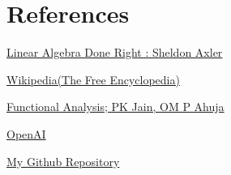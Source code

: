 \documentclass[12pt, a4paper]{article} %
\begin{document}
    \section{References}

    \href{https://www.amazon.in/Linear-Algebra-Right-Undergraduate-Mathematics/dp/3319110799}{Linear Algebra Done Right : Sheldon Axler}

    \href{https://www.wikipedia.org/}{Wikipedia(The Free Encyclopedia)}

    \href{https://www.amazon.in/Jain-K_Functional-Analysis-3ed-399/dp/9388818318/ref=pd_lpo_1?pd_rd_w=7bwU4&content-id=amzn1.sym.c3daf87c-2802-47b7-8fa4-23dc91a4fca7&pf_rd_p=c3daf87c-2802-47b7-8fa4-23dc91a4fca7&pf_rd_r=FGF7SKZPN6HC6SPPK134&pd_rd_wg=PMVzO&pd_rd_r=fd25d7b1-184f-47a8-85d9-82bc452d6210&pd_rd_i=9388818318&psc=1}{Functional Analysis; PK Jain, OM P Ahuja}

    \href{https://chat.openai.com/}{OpenAI}

    \href{https://github.com/akhlak919/LaTeX_stuffs}{My Github Repository}
\end{document}
